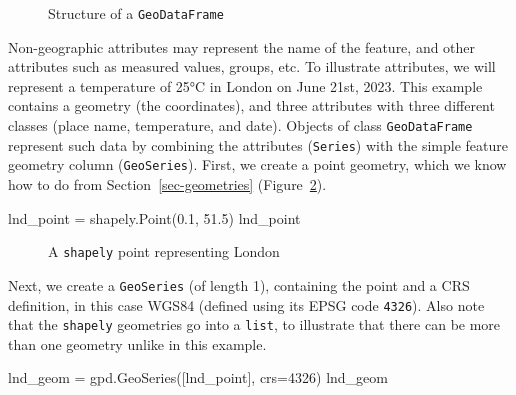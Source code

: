 \documentclass[
  letterpaper,
]{krantz}
\newenvironment{Shaded}{\begin{snugshade}}{\end{snugshade}}
\newcommand{\DecValTok}[1]{\textcolor[rgb]{0.68,0.00,0.00}{#1}}
\newcommand{\FloatTok}[1]{\textcolor[rgb]{0.68,0.00,0.00}{#1}}
\newcommand{\NormalTok}[1]{\textcolor[rgb]{0.00,0.23,0.31}{#1}}
\newcommand{\OperatorTok}[1]{\textcolor[rgb]{0.37,0.37,0.37}{#1}}
\begin{document}
\begin{figure}


\caption{\label{fig-gdf-structure}Structure of a \texttt{GeoDataFrame}}

\end{figure}%

Non-geographic attributes may represent the name of the feature, and
other attributes such as measured values, groups, etc. To illustrate
attributes, we will represent a temperature of 25°C in London on June
21st, 2023. This example contains a geometry (the coordinates), and
three attributes with three different classes (place name, temperature,
and date). Objects of class \texttt{GeoDataFrame} represent such data by
combining the attributes (\texttt{Series}) with the simple feature
geometry column (\texttt{GeoSeries}). First, we create a point geometry,
which we know how to do from Section~\ref{sec-geometries}
(Figure~\ref{fig-point-lnd}).

\begin{Shaded}
\begin{Highlighting}[]
\NormalTok{lnd\_point }\OperatorTok{=}\NormalTok{ shapely.Point(}\FloatTok{0.1}\NormalTok{, }\FloatTok{51.5}\NormalTok{)}
\NormalTok{lnd\_point}
\end{Highlighting}
\end{Shaded}

\begin{figure}[H]


\caption{\label{fig-point-lnd}A \texttt{shapely} point representing
London}

\end{figure}%

Next, we create a \texttt{GeoSeries} (of length 1), containing the point
and a CRS definition, in this case WGS84 (defined using its EPSG code
\texttt{4326}). Also note that the \texttt{shapely} geometries go into a
\texttt{list}, to illustrate that there can be more than one geometry
unlike in this example.

\begin{Shaded}
\begin{Highlighting}[]
\NormalTok{lnd\_geom }\OperatorTok{=}\NormalTok{ gpd.GeoSeries([lnd\_point], crs}\OperatorTok{=}\DecValTok{4326}\NormalTok{)}
\NormalTok{lnd\_geom}
\end{Highlighting}
\end{Shaded}
\end{document}

